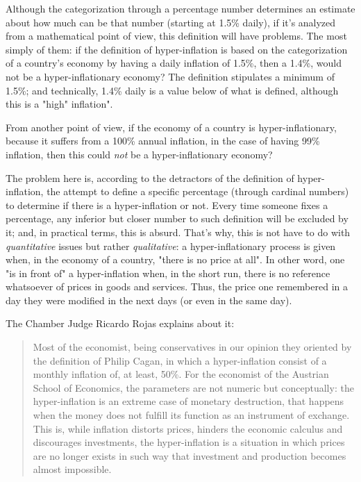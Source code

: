 \documentclass[12pt,a4paper,twoside]{book}
\begin{document}
Although the categorization through a percentage number determines an estimate about how much can be that number (starting at 1.5\% daily), if it's analyzed from a mathematical point of view, this definition will have problems. The most simply of them: if the definition of hyper-inflation is based on the categorization of a country's economy by having a daily inflation of 1.5\%, then a 1.4\%, would not be a hyper-inflationary economy? The definition stipulates a minimum of 1.5\%; and technically, 1.4\% daily is a value below of what is defined, although this is a "high" inflation".

From another point of view, if the economy of a country is hyper-inflationary, because it suffers from a 100\% annual inflation, in the case of having 99\% inflation, then this could \textit{not} be a hyper-inflationary economy?

The problem here is, according to the detractors of the definition of hyper-inflation, the attempt to define a specific percentage (through cardinal numbers) to determine if there is a hyper-inflation or not. Every time someone fixes a percentage, any inferior but closer number to such definition will be excluded by it; and, in practical terms, this is absurd. That's why, this is not have to do with \textit{quantitative} issues but rather \textit{qualitative}: a hyper-inflationary process is given when, in the economy of a country, "there is no price at all". In other word, one "is in front of" a hyper-inflation when, in the short run, there is no reference whatsoever of prices in goods and services. Thus, the price one remembered in a day they were modified in the next days (or even in the same day).

The Chamber Judge Ricardo Rojas explains about it:

\begin{quotation}
Most of the economist, being conservatives in our opinion they oriented by the definition of Philip Cagan, in which a hyper-inflation consist of a monthly inflation of, at least, 50\%. For the economist of the Austrian School of Economics, the parameters are not numeric but conceptually: the hyper-inflation is an extreme case of monetary destruction, that happens when the money does not fulfill its function as an instrument of exchange. This is, while inflation distorts prices, hinders the economic calculus and discourages investments, the hyper-inflation is a situation in which prices are no longer exists in such way that investment and production becomes almost impossible. \cite{rojas:genocidio}
\end{quotation}
\end{document}
